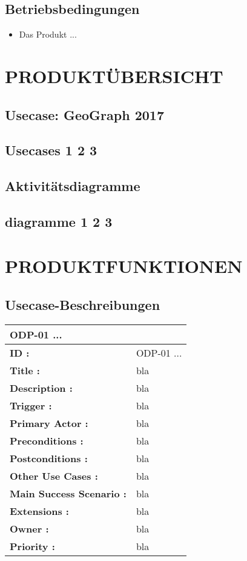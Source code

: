	\subsection{Betriebsbedingungen}
	\begin{itemize}
		\item Das Produkt ...
	\end{itemize}
	
	
	\section{\Large PRODUKTÜBERSICHT}
	\subsection{Usecase: GeoGraph 2017}
	\subsection{Usecases 1 2 3}
	\subsection{Aktivitätsdiagramme}
	\subsection{diagramme 1 2 3}


	\section{\Large PRODUKTFUNKTIONEN}
	\subsection{Usecase-Beschreibungen}

	\begin{table}
		\begin{tabular}{|p{8cm}|p{8cm}|}
			\hline
			\textbf{ODP-01 ...} \\ 
			\hline
			\textbf{ID :}\centering & ODP-01 ... \\ \hline 
			\textbf{Title :}\centering & bla \\ \hline 
			\textbf{Description :}\centering & bla \\ \hline 
			\textbf{Trigger :}\centering & bla \\ \hline 
			\textbf{Primary Actor :} \centering & bla \\ \hline 
			\textbf{Preconditions :}\centering & bla \\ \hline 
			\textbf{Postconditions :}\centering & bla \\ \hline
			\textbf{Other Use Cases :}\centering & bla \\ \hline  
			\textbf{Main Success Scenario :}\centering & bla \\ \hline  
			\textbf{Extensions :}\centering & bla \\ \hline  
			\textbf{Owner :}\centering & bla \\ \hline  
			\textbf{Priority :}\centering & bla \\ \hline  
		\end{tabular}
	\end{table}
	
